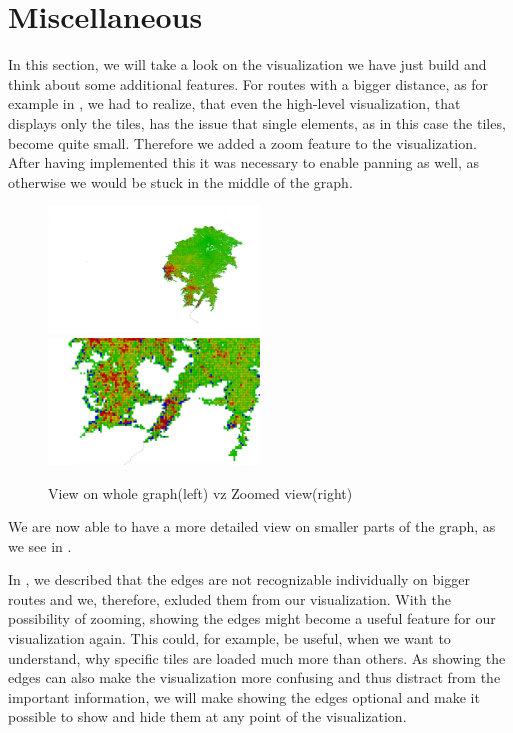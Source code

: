 \documentclass
[
    paper = a4,
    pagesize,
    12 pt,
    oneside,                       %
    open = right,
    DIV = calc,
    BCOR = 0 mm,                   %
    bibtotoc
]
{scrbook}
\begin{document}
\section{Miscellaneous}

In this section, we will take a look on the visualization we have just build and think about some additional features.
For routes with a bigger distance, as for example in , we had to realize, that even the high-level visualization, that displays only the tiles, has the issue that single elements, as in this case the tiles, become quite small.
Therefore we added a zoom feature to the visualization.
After having implemented this it was necessary to enable panning as well, as otherwise we would be stuck in the middle of the graph.

\begin{figure}
    \includegraphics[width=0.5\textwidth]{Images/vis-zoom-small.png}
    \includegraphics[width=0.5\textwidth]{Images/vis-zoom-large.png}
\caption[]{View on whole graph(left) vz Zoomed view(right)}
\label{fig:zoom}
\end{figure}

We are now able to have a more detailed view on smaller parts of the graph, as we see in .

In , we described that the edges are not recognizable individually on bigger routes and we, therefore, exluded them from our visualization.
With the possibility of zooming, showing the edges might become a useful feature for our visualization again.
This could, for example, be useful, when we want to understand, why specific tiles are loaded much more than others.
As showing the edges can also make the visualization more confusing and thus distract from the important information, we will make showing the edges optional and make it possible to show and hide them at any point of the visualization.
\end{document}
